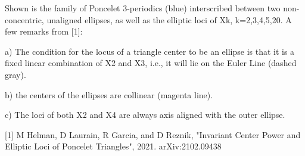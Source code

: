 Shown is the family of Poncelet 3-periodics (blue) interscribed between two non-concentric, unaligned ellipses, as well as the elliptic loci of Xk, k=2,3,4,5,20. A few remarks from [1]:

a) The condition for the locus of a triangle center to be an ellipse is that it is a fixed linear combination of X2 and X3, i.e., it will lie on the Euler Line (dashed gray).

b) the centers of the ellipses are collinear (magenta line). 

c) The loci of both X2 and X4 are always axis aligned with the outer ellipse. 

[1] M Helman, D Laurain, R Garcia, and D Reznik, "Invariant Center Power and Elliptic Loci of Poncelet Triangles", 2021. arXiv:2102.09438